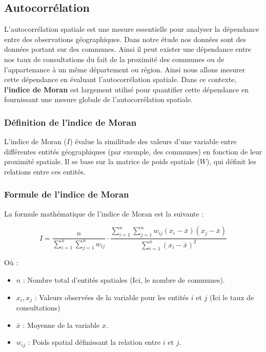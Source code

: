 \documentclass[
]{article}
\begin{document}
\hypertarget{autocorruxe9lation}{%
\subsection{Autocorrélation}\label{autocorruxe9lation}}

L'autocorrélation spatiale est une mesure essentielle pour analyser la
dépendance entre des observations géographiques. Dans notre étude nos
données sont des données portant sur des communes. Ainsi il peut exister
une dépendance entre nos taux de consultations du fait de la proximité
des communes ou de l'appartenance à un même département ou région. Ainsi
nous allons mesurer cette dépendance en évaluant l'autocorrélation
spatiale. Dans ce contexte, \textbf{l'indice de Moran} est largement
utilisé pour quantifier cette dépendance en fournissant une mesure
globale de l'autocorrélation spatiale.

\hypertarget{duxe9finition-de-lindice-de-moran}{%
\subsubsection{Définition de l'indice de
Moran}\label{duxe9finition-de-lindice-de-moran}}

L'indice de Moran (\(I\)) évalue la similitude des valeurs d'une
variable entre différentes entités géographiques (par exemple, des
communes) en fonction de leur proximité spatiale. Il se base sur la
matrice de poids spatiale (\(W\)), qui définit les relations entre ces
entités.

\hypertarget{formule-de-lindice-de-moran}{%
\subsubsection{Formule de l'indice de
Moran}\label{formule-de-lindice-de-moran}}

La formule mathématique de l'indice de Moran est la suivante :

\[
I = \frac{n}{\sum_{i=1}^n \sum_{j=1}^n w_{ij}} \cdot \frac{\sum_{i=1}^n \sum_{j=1}^n w_{ij} (x_i - \bar{x})(x_j - \bar{x})}{\sum_{i=1}^n (x_i - \bar{x})^2}
\]

Où :

\begin{itemize}
\item
  \(n\) : Nombre total d'entités spatiales (Ici, le nombre de communes).
\item
  \(x_i, x_j\) : Valeurs observées de la variable pour les entités \(i\)
  et \(j\) (Ici le taux de consultations)
\item
  \(\bar{x}\) : Moyenne de la variable \(x\).
\item
  \(w_{ij}\) : Poids spatial définissant la relation entre \(i\) et
  \(j\).
\end{itemize}
\end{document}

